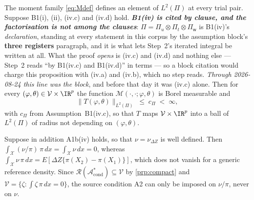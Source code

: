 \begin{proposition}\label{prp:wellposed}
The moment family \eqref{eq:Mdef} defines an element of $L^{2}(\Pi)$ at every trial pair.
Suppose B1(i), (ii), (iv.c) and (iv.d) hold. \emph{\textbf{B1(iv) is cited by clause, and the
factorisation is not among the clauses}}: $\Pi=\Pi_u\otimes\Pi_t\otimes\Pi_{\mathsf w}$ is B1(iv)'s
\emph{declaration}, standing at every statement in this corpus by the assumption block's \textbf{three
registers} paragraph, and it is what lets Step~2's iterated integral be written at all. What the proof
\emph{opens} is \textup{(iv.c)} and \textup{(iv.d)} and nothing else --- Step~2 reads ``by B1(iv.c) and
B1(iv.d)'' in terms --- so a block citation would charge this proposition with \textup{(iv.a)} and
\textup{(iv.b)}, which no step reads. \emph{Through 2026-08-24 this line was the block}, and before that
day it was \textup{(iv.c)} alone. Then for every $(\varphi,\theta)\in\mathcal V\times\IR^{p}$ the function
$\mathcal M(\cdot,\cdot;\varphi,\theta)$ is Borel measurable and
\[
\big\|T(\varphi,\theta)\big\|_{L^{2}(\Pi)}\;\le\;c_\Pi\;<\;\infty ,
\]
with $c_\Pi$ from Assumption~B1(iv.c), so that $T$ maps $\mathcal V\times\IR^{p}$ into a
ball of $L^{2}(\Pi)$ of radius not depending on $(\varphi,\theta)$.
\end{proposition}

\begin{remark}[$\nu$ versus $\nu/\pi$]\label{rem:nupi}
Suppose in addition A1b(iv) holds, so that $\nu=\nu_{\Delta Z}$ is well defined. Then
$\int_{\mathcal X}(\nu/\pi)\,\pi\,dx=\int_{\mathcal X}\nu\,dx=0$, whereas
$\int_{\mathcal X}\nu\,\pi\,dx=E[\Delta Z\{\pi(X_2)-\pi(X_1)\}]$, which does not vanish for a generic
reference density. Since $\mathcal R(\mathcal A^\ast_{\mathrm{cond}})\subseteq\mathcal V$ by
\cref{prp:compact} and $\mathcal V=\{\zeta:\int\zeta\,\pi\,dx=0\}$, the source condition A2 can only be
imposed on $\nu/\pi$, never on $\nu$.
\end{remark}


